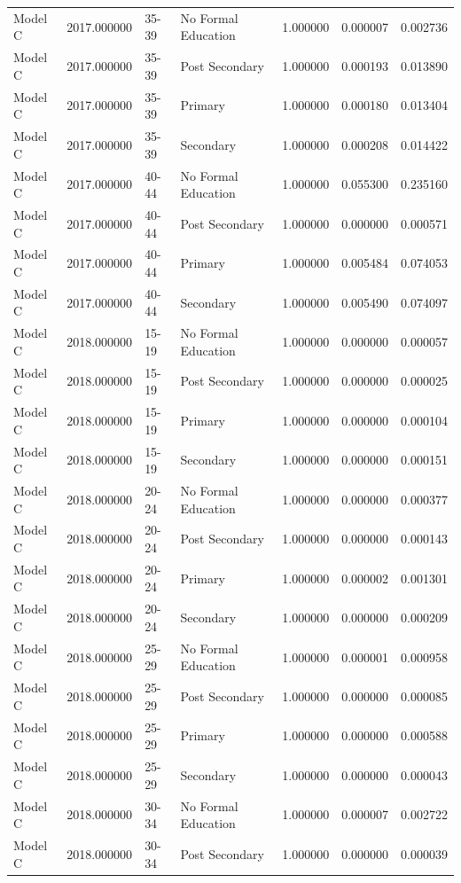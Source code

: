 \begin{table}[ht]
\begin{tabular}{lrllrrr}
Model C & 2017.000000 & 35-39 & No Formal Education & 1.000000 & 0.000007 & 0.002736 \\
Model C & 2017.000000 & 35-39 & Post Secondary & 1.000000 & 0.000193 & 0.013890 \\
Model C & 2017.000000 & 35-39 & Primary & 1.000000 & 0.000180 & 0.013404 \\
Model C & 2017.000000 & 35-39 & Secondary & 1.000000 & 0.000208 & 0.014422 \\
Model C & 2017.000000 & 40-44 & No Formal Education & 1.000000 & 0.055300 & 0.235160 \\
Model C & 2017.000000 & 40-44 & Post Secondary & 1.000000 & 0.000000 & 0.000571 \\
Model C & 2017.000000 & 40-44 & Primary & 1.000000 & 0.005484 & 0.074053 \\
Model C & 2017.000000 & 40-44 & Secondary & 1.000000 & 0.005490 & 0.074097 \\
Model C & 2018.000000 & 15-19 & No Formal Education & 1.000000 & 0.000000 & 0.000057 \\
Model C & 2018.000000 & 15-19 & Post Secondary & 1.000000 & 0.000000 & 0.000025 \\
Model C & 2018.000000 & 15-19 & Primary & 1.000000 & 0.000000 & 0.000104 \\
Model C & 2018.000000 & 15-19 & Secondary & 1.000000 & 0.000000 & 0.000151 \\
Model C & 2018.000000 & 20-24 & No Formal Education & 1.000000 & 0.000000 & 0.000377 \\
Model C & 2018.000000 & 20-24 & Post Secondary & 1.000000 & 0.000000 & 0.000143 \\
Model C & 2018.000000 & 20-24 & Primary & 1.000000 & 0.000002 & 0.001301 \\
Model C & 2018.000000 & 20-24 & Secondary & 1.000000 & 0.000000 & 0.000209 \\
Model C & 2018.000000 & 25-29 & No Formal Education & 1.000000 & 0.000001 & 0.000958 \\
Model C & 2018.000000 & 25-29 & Post Secondary & 1.000000 & 0.000000 & 0.000085 \\
Model C & 2018.000000 & 25-29 & Primary & 1.000000 & 0.000000 & 0.000588 \\
Model C & 2018.000000 & 25-29 & Secondary & 1.000000 & 0.000000 & 0.000043 \\
Model C & 2018.000000 & 30-34 & No Formal Education & 1.000000 & 0.000007 & 0.002722 \\
Model C & 2018.000000 & 30-34 & Post Secondary & 1.000000 & 0.000000 & 0.000039 \\

\end{tabular}
\end{table}
